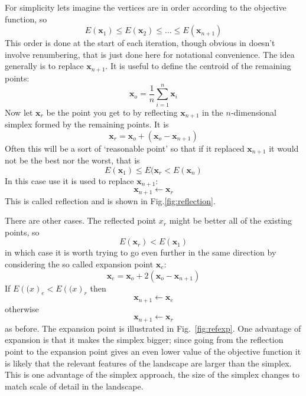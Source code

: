 \documentclass[11pt,a4paper]{scrartcl}
\begin{document}
For simplicity lets imagine the vertices are in order according to the
objective function, so
\begin{equation}
E(\mathbf{x}_1)\le E(\mathbf{x}_2)\le \ldots \le E(\mathbf{x}_{n+1})
\end{equation}
This order is done at the start of each iteration, though obvious in
doesn't involve renumbering, that is just done here for notational
convenience. The idea generally is to replace $\mathbf{x}_{n+1}$. It
is useful to define the centroid of the remaining points:
\begin{equation}
\mathbf{x}_o=\frac{1}{n}\sum_{i=1}^n\mathbf{x}_i
\end{equation}
Now let $\mathbf{x}_r$ be the point you get to by reflecting
$\mathbf{x}_{n+1}$ in the $n$-dimensional simplex formed by the
remaining points. It is
\begin{equation}
\mathbf{x}_r=\mathbf{x}_o+(\mathbf{x}_o-\mathbf{x}_{n+1})
\end{equation}
Often this will be a sort of \lq{}reasonable point\rq{} so that if it replaced
$\mathbf{x}_{n+1}$ it would not be the best nor the worst, that is
\begin{equation}
E(\mathbf{x}_1)\le E(\mathbf{x}_r < E(\mathbf{x}_n)
\end{equation}
In this case use it is used to replace $\mathbf{x}_{n+1}$:
\begin{equation}
\mathbf{x}_{n+1}\leftarrow \mathbf{x}_r
\end{equation}
This is called reflection and is shown in
Fig.\ref{fig:reflection}.

There are other cases. The reflected point $x_r$ might be better all
of the existing points, so
\begin{equation}
E(\mathbf{x}_r)<E(\mathbf{x}_1)
\end{equation}
in which case it is worth trying to go even further in the same
direction by considering the so called expansion point $\mathbf{x}_e$:
\begin{equation}
\mathbf{x}_e=\mathbf{x}_o+2(\mathbf{x}_o-\mathbf{x}_{n+1})
\end{equation}
If $E(\mathbf(x)_e<E(\mathbf(x)_r$ then
\begin{equation}
\mathbf{x}_{n+1}\leftarrow \mathbf{x}_e
\end{equation}
otherwise
\begin{equation}
\mathbf{x}_{n+1}\leftarrow \mathbf{x}_r
\end{equation}
as before. The expansion point is illustrated in
Fig.~\ref{fig:refexp}. One advantage of expansion is that it makes the
simplex bigger; since going from the reflection point to the expansion
point gives an even lower value of the objective function it is likely
that the relevant features of the landscape are larger than the
simplex. This is one advantage of the simplex approach, the size of
the simplex changes to match scale of detail in the landscape.
\end{document}
